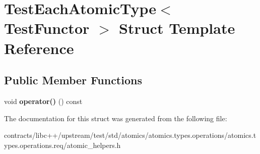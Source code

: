 \hypertarget{struct_test_each_atomic_type}{}\section{Test\+Each\+Atomic\+Type$<$ Test\+Functor $>$ Struct Template Reference}
\label{struct_test_each_atomic_type}
\subsection*{Public Member Functions}
\begin{DoxyCompactItemize}
\item 
\mbox{\label{struct_test_each_atomic_type_a9e174a09b6b48e0cb5a5430640e53bc3}} 
void {\bfseries operator()} () const
\end{DoxyCompactItemize}


The documentation for this struct was generated from the following file\+:\begin{DoxyCompactItemize}
\item 
contracts/libc++/upstream/test/std/atomics/atomics.\+types.\+operations/atomics.\+types.\+operations.\+req/atomic\+\_\+helpers.\+h\end{DoxyCompactItemize}
